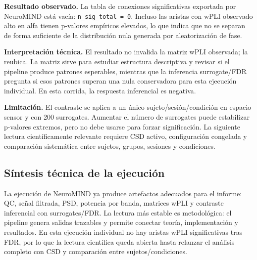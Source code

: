 \textbf{Resultado observado.} La tabla de conexiones significativas exportada por NeuroMIND está vacía: \texttt{n\_sig\_total = 0}. Incluso las aristas con wPLI observado alto en alfa tienen p-valores empíricos elevados, lo que indica que no se separan de forma suficiente de la distribución nula generada por aleatorización de fase.

\textbf{Interpretación técnica.} El resultado no invalida la matriz wPLI observada; la reubica. La matriz sirve para estudiar estructura descriptiva y revisar si el pipeline produce patrones esperables, mientras que la inferencia surrogate/FDR pregunta si esos patrones superan una nula conservadora para esta ejecución individual. En esta corrida, la respuesta inferencial es negativa.

\textbf{Limitación.} El contraste se aplica a un único sujeto/sesión/condición en espacio sensor y con 200 surrogates. Aumentar el número de surrogates puede estabilizar p-valores extremos, pero no debe usarse para forzar significación. La siguiente lectura científicamente relevante requiere CSD activo, configuración congelada y comparación sistemática entre sujetos, grupos, sesiones y condiciones.

\subsection{Síntesis técnica de la ejecución}

\begin{ideaclave}
La ejecución de NeuroMIND ya produce artefactos adecuados para el informe: QC, señal filtrada, PSD, potencia por banda, matrices wPLI y contraste inferencial con surrogates/FDR. La lectura más estable es metodológica: el pipeline genera salidas trazables y permite conectar teoría, implementación y resultados. En esta ejecución individual no hay aristas wPLI significativas tras FDR, por lo que la lectura científica queda abierta hasta relanzar el análisis completo con CSD y comparación entre sujetos/condiciones.
\end{ideaclave}

